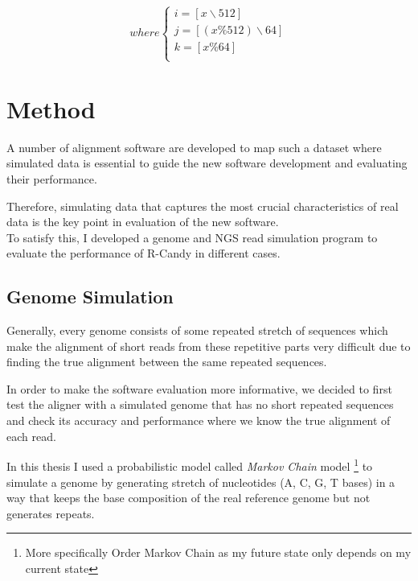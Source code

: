 \documentclass[11pt,a4paper]{report}
\begin{document}
\[ where
\begin{cases}
	i=[ x \backslash 512 ]\\
	j=[(x \% 512 )\backslash 64 ]\\
	k=[ x \% 64  ]\\
\end{cases}
\]



\section{Method} \label{Method}
A number of alignment software are developed to map such a dataset where 
simulated data is essential to guide the new software development and 
evaluating their performance.

Therefore, simulating data that captures the most crucial characteristics 
of real data is the key point in evaluation of the new software.\\

To satisfy this, I developed a genome and NGS read simulation program to evaluate 
the performance of R-Candy in different cases.



\subsection{Genome Simulation} 
\label{ Genome Simulation }

Generally, every genome consists of some repeated stretch of sequences which make 
the alignment of short reads from these repetitive parts very difficult due to 
finding the true alignment between the same repeated sequences.

In order to make the software evaluation more informative, we decided to first 
test the aligner with a simulated genome that has no short repeated sequences 
and check its accuracy and performance where we know the true alignment of each 
read.

In this thesis I used a probabilistic model called \emph{Markov Chain} model 
\footnote{More specifically  Order Markov Chain as my future state only 
depends on my current state} to simulate a genome by generating stretch of 
nucleotides (A, C, G, T bases) in a way that  keeps the base composition of the 
real reference genome but not generates repeats.
 
\end{document}
